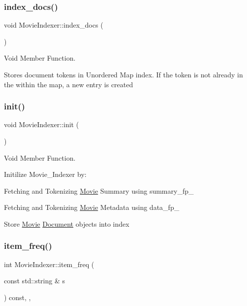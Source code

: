 \subsubsection{\texorpdfstring{index\+\_\+docs()}{index\_docs()}}
{\footnotesize\ttfamily void Movie\+Indexer\+::index\+\_\+docs (\begin{DoxyParamCaption}{ }\end{DoxyParamCaption})\hspace{0.3cm}{\ttfamily [private]}}



Void Member Function. 

Stores document tokens in Unordered Map index. If the token is not already in the within the map, a new entry is created \mbox{\label{class_movie_indexer_a26ea53a1f47d8faa54a6289cda606003}} 
\subsubsection{\texorpdfstring{init()}{init()}}
{\footnotesize\ttfamily void Movie\+Indexer\+::init (\begin{DoxyParamCaption}{ }\end{DoxyParamCaption})\hspace{0.3cm}{\ttfamily [private]}}



Void Member Function. 

Initilize Movie\+\_\+\+Indexer by\+:
\begin{DoxyItemize}
\item Fetching and Tokenizing \hyperlink{class_movie}{Movie} Summary using summary\+\_\+fp\+\_\+
\item Fetching and Tokenizing \hyperlink{class_movie}{Movie} Metadata using data\+\_\+fp\+\_\+
\item Store \hyperlink{class_movie}{Movie} \hyperlink{class_document}{Document} objects into index 
\end{DoxyItemize}\mbox{\label{class_movie_indexer_ac19449df057ce8f16490bc42adab2b3c}} 
\subsubsection{\texorpdfstring{item\+\_\+freq()}{item\_freq()}}
{\footnotesize\ttfamily int Movie\+Indexer\+::item\+\_\+freq (\begin{DoxyParamCaption}\item[{const std\+::string \&}]{s }\end{DoxyParamCaption}) const\hspace{0.3cm}{\ttfamily [override]}, {\ttfamily [private]}, {\ttfamily [virtual]}}



